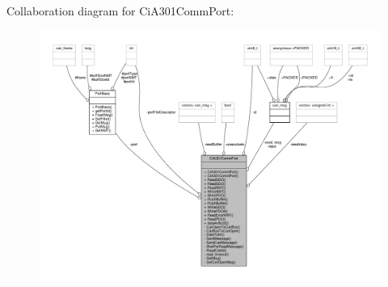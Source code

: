 Collaboration diagram for Ci\+A301\+Comm\+Port\+:
\nopagebreak
\begin{figure}[H]
\begin{center}
\leavevmode
\includegraphics[width=350pt]{classCiA301CommPort__coll__graph}
\end{center}
\end{figure}
